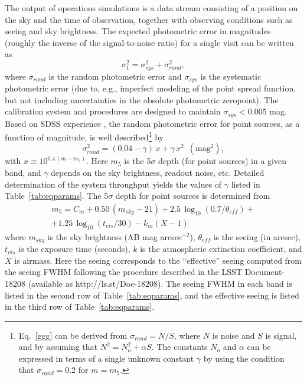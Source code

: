 The output of operations simulations is a data stream consisting of
a position on the sky and the time of observation, together with
observing conditions such as seeing and sky brightness. The expected
photometric error in magnitudes (roughly the inverse of the
signal-to-noise ratio) for a single visit can be written as
\begin{equation}
         \sigma_1^2 = \sigma_{sys}^2 + \sigma_{rand}^2,
\end{equation}
where $\sigma_{rand}$ is the random photometric error and $\sigma_{sys}$ is
the systematic photometric error (due to, e.g., imperfect
modeling of the point spread function, but not including uncertainties
in the
absolute photometric zeropoint). The calibration system and procedures
are designed to maintain $\sigma_{sys}<0.005$ mag. Based on
SDSS experience \citep{2007AJ....134.2236S}, the random photometric error for
point sources, as
a function of magnitude, is well described\footnote{Eq.~\ref{ggg} can
be derived from $\sigma_{rand}=N/S$, where $N$ is noise and $S$ is signal,
and by assuming that $N^2 = N_o^2 + \alpha S$. The constants $N_o$ and
$\alpha$ can be expressed in terms of a single unknown constant $\gamma$
by using the condition that $\sigma_{rand}=0.2$ for $m=m_5$.} by
\begin{equation}
\label{ggg}
  \sigma_{rand}^2 = (0.04-\gamma)\, x + \gamma \, x^2 \,\,\, \mathrm{(mag^2),}
\end{equation}
with $x \equiv 10^{0.4\,(m-m_5)}$. Here $m_5$ is the 5$\sigma$ depth (for
point sources) in a given band, and $\gamma$ depends on the sky
brightness, readout noise, etc.
Detailed determination of the system throughput yields the values of $\gamma$
listed in Table~\ref{tab:eqparams}. The 5$\sigma$ depth for point sources is determined from
\begin{eqnarray}
\label{m5}
  m_5 = C_m + 0.50\,(m_{sky}-21) + 2.5\,\log_{10}(0.7/\theta_{eff}) +  \nonumber \\
        + 1.25\,\log_{10}(t_{vis}/30) - k_m(X-1) \phantom{xxxxx}
\end{eqnarray}
where $m_{sky}$ is the sky brightness (AB mag arcsec$^{-2}$), $\theta_{eff}$ is
the seeing (in arcsec), $t_{vis}$ is the exposure time (seconds),
$k$ is the atmospheric extinction coefficient, and $X$ is airmass. Here
the seeing corresponds to the ``effective'' seeing computed from
the seeing FWHM following the procedure described in the LSST Document-18208
(available as http://ls.st/Doc-18208). The seeing FWHM in each band is listed in
the second row of Table~\ref{tab:eqparams}, and the effective seeing is listed in the
third row of Table~\ref{tab:eqparams}.

